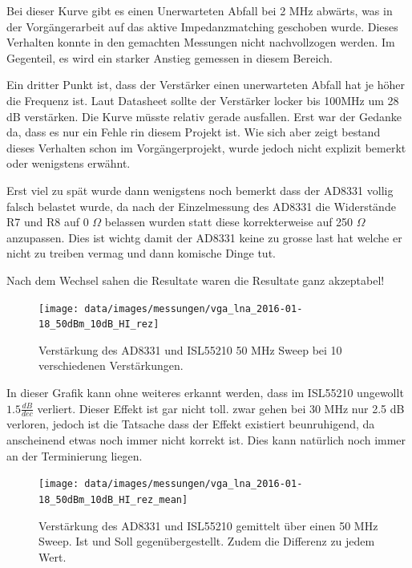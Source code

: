 Bei dieser Kurve gibt es einen Unerwarteten Abfall bei 2 MHz abwärts, was in der Vorgängerarbeit auf das aktive Impedanzmatching geschoben wurde. Dieses Verhalten konnte in den gemachten Messungen nicht nachvollzogen werden. Im Gegenteil, es wird ein starker Anstieg gemessen in diesem Bereich.

Ein dritter Punkt ist, dass der Verstärker einen unerwarteten Abfall hat je höher die Frequenz ist. Laut Datasheet sollte der Verstärker locker bis 100MHz um 28 dB verstärken. Die Kurve müsste relativ gerade ausfallen. Erst war der Gedanke da, dass es nur ein Fehle rin diesem Projekt ist. Wie sich aber zeigt bestand dieses Verhalten schon im Vorgängerprojekt, wurde jedoch nicht explizit bemerkt oder wenigstens erwähnt.

Erst viel zu spät wurde dann wenigstens noch bemerkt dass der AD8331 vollig falsch belastet wurde, da nach der Einzelmessung des AD8331 die Widerstände R7 und R8 auf 0 $\Omega$ belassen wurden statt diese korrekterweise auf 250 $\Omega$ anzupassen. Dies ist wichtg damit der AD8331 keine zu grosse last hat welche er nicht zu treiben vermag und dann komische Dinge tut.

Nach dem Wechsel sahen die Resultate waren die Resultate ganz akzeptabel!

\begin{figure}[H]
\begin{center}
    \texttt{[image: data/images/messungen/vga\_lna\_2016-01-18\_50dBm\_10dB\_HI\_rez]}
    \caption{Verstärkung des AD8331 und ISL55210 50 MHz Sweep bei 10 verschiedenen Verstärkungen.}
    \label{fig:T_fixed_ISL55210}
\end{center}
\end{figure}

In dieser Grafik kann ohne weiteres erkannt werden, dass im ISL55210 ungewollt $1.5 \frac{dB}{dec}$ verliert. Dieser Effekt ist gar nicht toll. zwar gehen bei 30 MHz nur 2.5 dB verloren, jedoch ist die Tatsache dass der Effekt existiert beunruhigend, da anscheinend etwas noch immer nicht korrekt ist. Dies kann natürlich noch immer an der Terminierung liegen.

\begin{figure}[H]
\begin{center}
    \texttt{[image: data/images/messungen/vga\_lna\_2016-01-18\_50dBm\_10dB\_HI\_rez\_mean]}
    \caption{Verstärkung des AD8331 und ISL55210 gemittelt über einen 50 MHz Sweep. Ist und Soll gegenübergestellt. Zudem die Differenz zu jedem Wert.}
    \label{fig:T_fixed_mean_ISL55210}
\end{center}
\end{figure}

